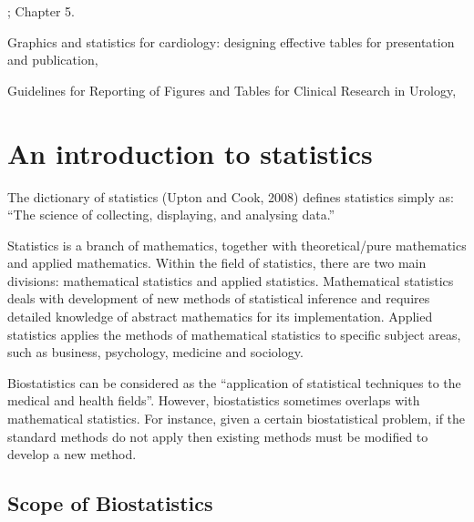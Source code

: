 \documentclass[
]{memoir}
\begin{document}
\citet{acock10}; Chapter 5.

Graphics and statistics for cardiology: designing effective tables for presentation and publication, \citet{boers18}

Guidelines for Reporting of Figures and Tables for Clinical Research in Urology, \citet{vickers_etal20}

\hypertarget{an-introduction-to-statistics}{%
\section{An introduction to statistics}\label{an-introduction-to-statistics}}

The dictionary of statistics (Upton and Cook, 2008) defines statistics simply as: ``The science of collecting, displaying, and analysing data.''

Statistics is a branch of mathematics, together with theoretical/pure mathematics and applied mathematics. Within the field of statistics, there are two main divisions: mathematical statistics and applied statistics. Mathematical statistics deals with development of new methods of statistical inference and requires detailed knowledge of abstract mathematics for its implementation. Applied statistics applies the methods of mathematical statistics to specific subject areas, such as business, psychology, medicine and sociology.

Biostatistics can be considered as the ``application of statistical techniques to the medical and health fields''. However, biostatistics sometimes overlaps with mathematical statistics. For instance, given a certain biostatistical problem, if the standard methods do not apply then existing methods must be modified to develop a new method.

\hypertarget{scope-of-biostatistics}{%
\subsection{Scope of Biostatistics}\label{scope-of-biostatistics}}
\end{document}
